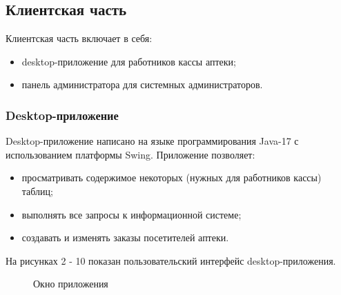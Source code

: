 \documentclass[a4paper]{article}
\begin{document}
		\subsection{Клиентская часть}
			Клиентская часть включает в себя:
			\begin{itemize}
				\item desktop-приложение для работников кассы аптеки;
				
				\item панель администратора для системных администраторов.
			\end{itemize}

			\subsubsection{Desktop-приложение}
				Desktop-приложение написано на языке программирования Java-17 с использованием платформы Swing. Приложение позволяет:
				\begin{itemize}[nosep]
					\item просматривать содержимое некоторых (нужных для работников кассы) таблиц;
					
					\item выполнять все запросы к информационной системе;
					
					\item создавать и изменять заказы посетителей аптеки.
				\end{itemize}
					
				\bigskip
					
				На рисунках 2 - 10 показан пользовательский интерфейс desktop-приложения. 
					
				\begin{figure}[H]
					\centering
					\caption{Окно приложения}
				\end{figure}
				
\end{document}
